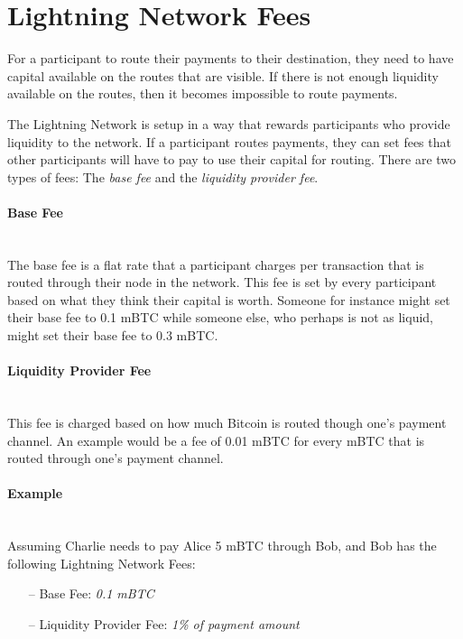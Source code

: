 \documentclass[a4paper, 12pt]{report}
\begin{document}
\section{Lightning Network Fees} \label{sec:Lightning_Network_Fees}
\par For a participant to route their payments to their destination, they need to have capital available on the routes that are visible. If there is not enough liquidity available on the routes, then it becomes impossible to route payments.
\par The Lightning Network is setup in a way that rewards participants who provide liquidity to the network. If a participant routes payments, they can set fees that other participants will have to pay to use their capital for routing.\newline
There are two types of fees: The \textit{base fee} and the \textit{liquidity provider fee}. 

\paragraph{Base Fee} \hspace{0pt} \\
The base fee is a flat rate that a participant charges per transaction that is routed through their node in the network. This fee is set by every participant based on what they think their capital is worth. Someone for instance might set their base fee to 0.1 mBTC while someone else, who perhaps is not as liquid, might set their base fee to 0.3 mBTC.

\paragraph{Liquidity Provider Fee} \hspace{0pt} \\
This fee is charged based on how much Bitcoin is routed though one’s payment channel. An example would be a fee of 0.01 mBTC for every mBTC that is routed through one’s payment channel.

\paragraph{Example} \hspace{0pt} \\
Assuming Charlie needs to pay Alice 5 mBTC through Bob, and Bob has the following Lightning Network Fees: 

\begin{itemize}
	\item[--] Base Fee: \tab \textit{0.1 mBTC} 
	\item[--] Liquidity Provider Fee: \tab \textit{1\% of payment amount} 
\end{itemize}
\end{document}
